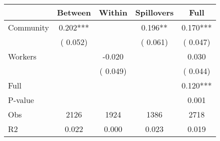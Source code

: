 
\begin{tabular}{l*{4}{c}}\hline&\multicolumn{1}{c}{Between}&\multicolumn{1}{c}{Within}&\multicolumn{1}{c}{Spillovers}&\multicolumn{1}{c}{Full}\\ \hline
 Community             &              0.202***      &                                               &        0.196** &         0.170***                            \\ 
                               &        (       0.052)           &                                       &       (       0.061)     &      (       0.047)                                           \\ 
 Workers       &                                               &       -0.020    &                                &             0.030                            \\ 
                               &                                               & (       0.049)                  &                                        &      (       0.044)                                           \\ 
\hline                                                                                                                                                                                                                                            
 Full                  &                                               &                                               &                                        &             0.120***                                     \\ 
 P-value               &                                               &                                               &                                        &             0.001                                           \\ 
 Obs                   &               2126               &       1924                       &       1386                &              2718                                               \\ 
 R2                    &                      0.022              &              0.000                      &              0.023               &                     0.019                                              \\ 
\hline \end{tabular}                                                                                                                                                                                                              